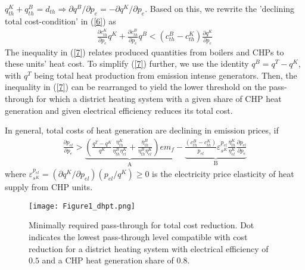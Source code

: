 \documentclass[preprint, 12pt, authoryear]{elsarticle}
\begin{document}
$q_{th}^{K} + q_{th}^{B} = d_{th} \Rightarrow \partial q^{B} /\partial p_{e} = - \partial q^{K} / \partial p_{e}$.
Based on this, we rewrite the 'declining total cost-condition' in (\ref{6}) as
\begin{align}\label{7}
\frac{\partial c_{th}^{K}}{\partial p_{e}} q^{K} + \frac{\partial c_{th}^{B}}{\partial p_{e}} q^{B} < (c_{th}^{B} - c_{th}^{K})\frac{\partial q^{K}}{\partial p_{e}}
\end{align}
The inequality in (\ref{7}) relates produced quantities from boilers and CHPs to these units' heat cost.
To simplify (\ref{7}) further, we use the identity $q^{B} = q^{T} - q^{K}$, with $q^{T}$ being total heat production from emission intense generators. 
Then, the inequality in (\ref{7}) can be rearranged to yield the lower threshold on the pass-through for which a district heating system with a given share of CHP heat generation and given electrical efficiency reduces its total cost.

In general, total costs of heat generation are declining in emission prices, if
\begin{align}\label{8}
\frac{\partial p_{el}}{\partial p_e} > \underbrace{\left( \frac{q^T - q^K}{q^K} \frac{\eta_{th}^{K}}{\eta_{th}^{B} \eta_{el}^{K}} + \frac{\eta_{th}^{B}}{\eta_{th}^{B} \eta_{el}^{K}} \right) em_{f}}_\text{A} - \underbrace{ \frac{(c_{th}^{B} - c_{th}^{K})}{p_{el}} \varepsilon_{s^{K}}^{p_{el}} \frac{\eta_{th}^{K}}{\eta_{el}^{K}} \frac{\partial p_{el}}{\partial p_{e}}}_\text{B}
\end{align}
where $\varepsilon_{s^{K}}^{p_{el}} = (\partial q^{K} / \partial p_{el}) (p_{el} / q^{K}) \geq 0$ is the electricity price elasticity of heat supply from CHP units.
\begin{figure}[t]
\centering
\texttt{[image: Figure1\_dhpt.png]}
\caption{Minimally required pass-through for total cost reduction. Dot indicates the lowest pass-through level compatible with cost reduction for a district heating system with electrical efficiency of $0.5$ and a CHP heat generation share of $0.8$.}\label{Fig1}
\end{figure}
\end{document}
